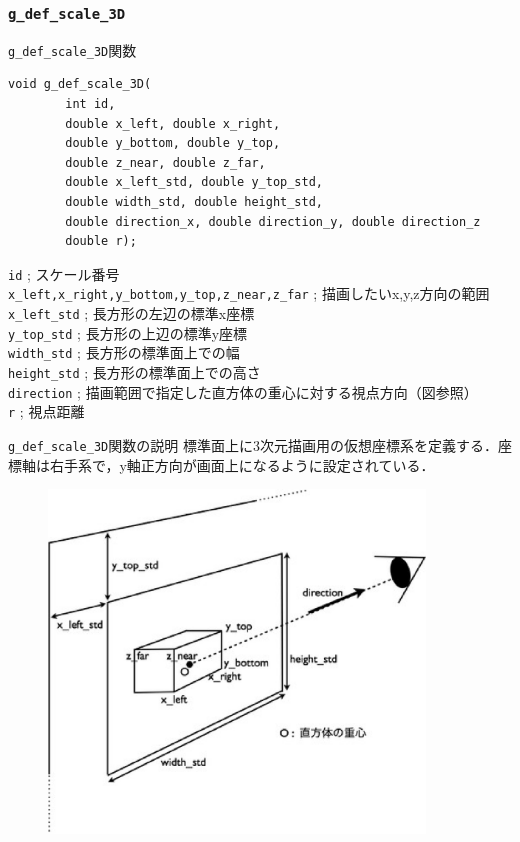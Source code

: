 \documentclass[platex,a4paper,12pt]{jsarticle}%
\begin{document}
\clearpage
\subsubsection{\texttt{g\_def\_scale\_3D}}

\begin{itembox}[l]{\texttt{g\_def\_scale\_3D}関数}
\begin{verbatim}
void g_def_scale_3D(
        int id,
        double x_left, double x_right,
        double y_bottom, double y_top,
        double z_near, double z_far,
        double x_left_std, double y_top_std,
        double width_std, double height_std,
        double direction_x, double direction_y, double direction_z
        double r);
\end{verbatim}
\verb|id| ; スケール番号\\
\verb|x_left,x_right,y_bottom,y_top,z_near,z_far| ; 描画したいx,y,z方向の範囲\\
\verb|x_left_std| ; 長方形の左辺の標準x座標\\
\verb|y_top_std| ; 長方形の上辺の標準y座標\\
\verb|width_std| ; 長方形の標準面上での幅\\
\verb|height_std| ; 長方形の標準面上での高さ\\
\verb|direction| ; 描画範囲で指定した直方体の重心に対する視点方向（図参照）\\
\verb|r| ; 視点距離 
\end{itembox}

\begin{itembox}[l]{\texttt{g\_def\_scale\_3D}関数の説明}
標準面上に3次元描画用の仮想座標系を定義する．座標軸は右手系で，y軸正方向が画面上になるように設定されている．
\end{itembox}

\begin{figure}[htb]
\centering
\includegraphics[width=100mm]{./Figures/eps/Canvas_g_def_scale_3D.eps}
\end{figure}
\end{document}
